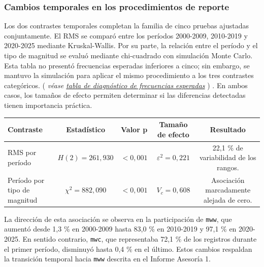 \documentclass[
  spanish,
  letterpaper,
  DIV=11,
  numbers=noendperiod]{scrartcl}
\newcommand{\asesoriaParenRef}[1]{%
  \textnormal{\textcolor{asesoriaTextColor}{(}}%
  {\hypersetup{linkcolor=asesoriaLinkColor,urlcolor=asesoriaLinkColor,citecolor=asesoriaLinkColor}\textcolor{asesoriaTextColor}{\emph{#1}}}%
  \textnormal{\textcolor{asesoriaTextColor}{)}}%
}
\begin{document}
\subsubsection{Cambios temporales en los procedimientos de
reporte}\label{cambios-temporales-en-los-procedimientos-de-reporte}

Los dos contrastes temporales completan la familia de cinco pruebas
ajustadas conjuntamente. El RMS se comparó entre los períodos 2000-2009,
2010-2019 y 2020-2025 mediante Kruskal-Wallis. Por su parte, la relación
entre el período y el tipo de magnitud se evaluó mediante chi-cuadrado
con simulación Monte Carlo. Esta tabla no presentó frecuencias esperadas
inferiores a cinco; sin embargo, se mantuvo la simulación para aplicar
el mismo procedimiento a los tres contrastes categóricos.
\asesoriaParenRef{véase \hyperref[tbl-diagnostico-esperadas]{tabla de diagnóstico de frecuencias esperadas}}.
En ambos casos, los tamaños de efecto permiten determinar si las
diferencias detectadas tienen importancia práctica.

\begingroup
\scriptsize
\centering
\setlength{\tabcolsep}{2.2pt}
\renewcommand{\arraystretch}{0.82}
{}
\label{tbl-comparabilidad-temporal}
\hypertarget{dest-tbl-comparabilidad-temporal}{}
\begin{tabular}{@{}lcccc@{}}
\toprule
Contraste & Estadístico & Valor p & Tamaño de efecto & Resultado \\
\midrule
RMS por período & $H(2)=261{,}930$ & $<0{,}001$ & $\varepsilon^2=0{,}221$ & 22,1 \% de variabilidad de los rangos. \\
Período por tipo de magnitud & $\chi^2=882{,}090$ & $<0{,}001$ & $V_{c}=0{,}608$ & Asociación marcadamente alejada de cero. \\
\bottomrule
\end{tabular}
\par\vspace{-0.85em}
\endgroup

La dirección de esta asociación se observa en la participación de
\texttt{mww}, que aumentó desde 1,3 \% en 2000-2009 hasta 83,0 \% en
2010-2019 y 97,1 \% en 2020-2025. En sentido contrario, \texttt{mwc},
que representaba 72,1 \% de los registros durante el primer período,
disminuyó hasta 0,4 \% en el último. Estos cambios respaldan la
transición temporal hacia \texttt{mww} descrita en el Informe Asesoría
1.
\end{document}
